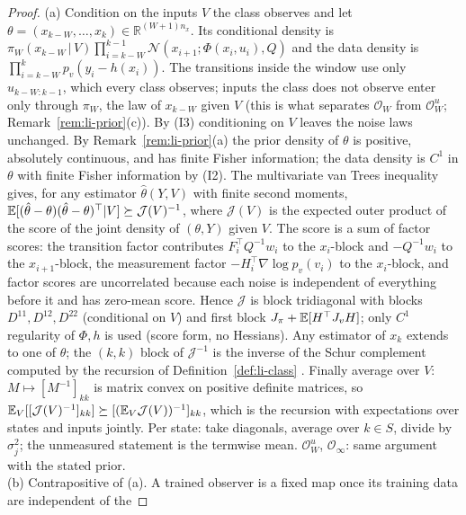 \begin{proof}
(a) Condition on the inputs $V$ the class observes and let $\theta=(x_{k-W},\dots,x_k)\in\mathbb R^{(W+1)n_x}$. Its
conditional density is
$\pi_W(x_{k-W}\,|\,V)\prod_{i=k-W}^{k-1}\mathcal N(x_{i+1};\Phi(x_i,u_i),Q)$ and the data density is
$\prod_{i=k-W}^{k}p_v(y_i-h(x_i))$. The transitions inside the window use only $u_{k-W:k-1}$, which every class
observes; inputs the class does not observe enter only through $\pi_W$, the law of $x_{k-W}$ given $V$ (this is what
separates $\mathcal O_W$ from $\mathcal O^u_W$; Remark~\ref{rem:li-prior}(c)). By (I3) conditioning on $V$ leaves the
noise laws unchanged. By Remark~\ref{rem:li-prior}(a) the prior density of
$\theta$ is positive, absolutely continuous, and has finite Fisher information; the data density is $C^1$ in
$\theta$ with finite Fisher information by (I2). The multivariate van Trees inequality
\citep{vantrees1968detection,gill1995applications} gives, for any estimator $\hat\theta(Y,V)$ with finite second
moments, $\mathbb E[(\hat\theta-\theta)(\hat\theta-\theta)^\top|V]\succeq\mathcal J(V)^{-1}$, where $\mathcal J(V)$ is the expected outer
product of the score of the joint density of $(\theta,Y)$ given $V$. The score is a sum of factor scores: the
transition factor contributes $F_i^\top Q^{-1}w_i$ to the $x_i$-block and $-Q^{-1}w_i$ to the $x_{i+1}$-block, the
measurement factor $-H_i^\top\nabla\log p_v(v_i)$ to the $x_i$-block, and factor scores are uncorrelated because each
noise is independent of everything before it and has zero-mean score. Hence $\mathcal J$ is block tridiagonal with
blocks $D^{11},D^{12},D^{22}$ (conditional on $V$) and first block $J_\pi+\mathbb E[H^\top J_vH]$; only $C^1$ regularity of
$\Phi,h$ is used (score form, no Hessians). Any estimator of $x_k$ extends to one of $\theta$; the $(k,k)$ block of
$\mathcal J^{-1}$ is the inverse of the Schur complement computed by the recursion of Definition~\ref{def:li-class}
\citep[Prop.~1 and Thm.~1]{tichavsky1998posterior}. Finally average over $V$: $M\mapsto[M^{-1}]_{kk}$ is matrix convex
on positive definite matrices, so $\mathbb E_V[[\mathcal J(V)^{-1}]_{kk}]\succeq[(\mathbb E_V\mathcal J(V))^{-1}]_{kk}$, which is the
recursion with expectations over states and inputs jointly. Per state: take diagonals, average over $k\in S$, divide
by $\sigma_j^2$; the unmeasured statement is the termwise mean. $\mathcal O^u_W$, $\mathcal O_\infty$: same argument
with the stated prior.\\
(b) Contrapositive of (a). A trained observer is a fixed map once its training data are independent of the

\end{proof}
